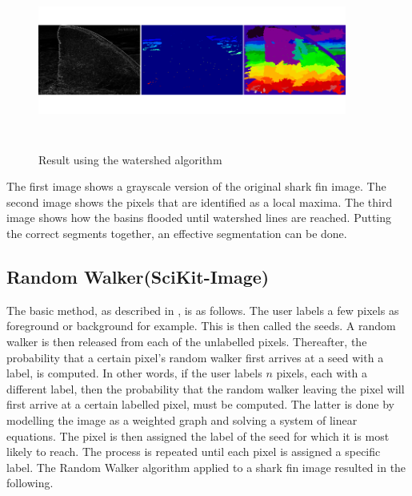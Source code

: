 \documentclass[a4paper,10pt]{article}
\begin{document}
\begin{figure}[H]
\centering
\includegraphics[width=4in,height=2in]{watershed.png} 
\label{fig1}
\caption{Result using the watershed algorithm}
\end{figure}

\noindent The first image shows a grayscale version of the original shark fin image.  The second image shows the pixels that are identified as a local maxima.  The third image shows how the basins flooded until watershed lines are reached.  Putting the correct segments together, an effective segmentation can be done.

\subsection{Random Walker(SciKit-Image)}
The basic method, as described in \cite{rw}, is as follows.  The user labels a few pixels as foreground or background for example.  This is then called the seeds.  A random walker is then released from each of the unlabelled pixels.  Thereafter, the probability that a certain pixel's random walker first arrives at a seed with a label, is computed.  In other words, if the user labels $n$ pixels, each with a different label, then the probability that the random walker leaving the pixel will first arrive at a certain labelled pixel, must be computed.  The latter is done by modelling the image as a weighted graph and solving a system of linear equations.  The pixel is then assigned the label of the seed for which it is most likely to reach.  The process is repeated until each pixel is assigned a specific label.  The Random Walker algorithm applied to a shark fin image resulted in the following.
\end{document}
